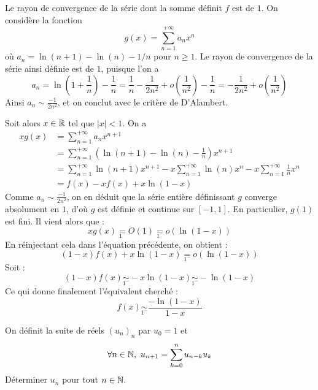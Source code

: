 \begin{solution}
Le rayon de convergence de la série dont la somme définit $f$ est de $1.$
On considère la fonction 
\[
    g(x)=\displaystyle\sum_{n=1}^{+\infty}a_nx^n
\] où $a_n=\ln(n+1)-\ln(n)-1/n$ pour $n\geq 1$.
Le rayon de convergence de la série ainsi définie est de $1$, puisque l'on a \[a_n=\ln\left(1+\frac1n\right)-\frac1n=\frac1n-\frac1{2n^2}+o\left(\frac1{n^2}\right)-\frac1n=-\frac1{2n^2}+o\left(\frac1{n^2}\right)\] 
Ainsi $a_n\sim\frac{-1}{2n^2}$, et on conclut avec le critère de D'Alambert.

Soit alors $x\in\operatorname{\mathbb R}$ tel que $|x|<1$. On a 
\begin{align*}
	xg(x)&=\displaystyle\sum_{n=1}^{+\infty}a_nx^{n+1}\\
		&=\displaystyle\sum_{n=1}^{+\infty}\left(\ln(n+1)-\ln(n)-\frac1n\right)x^{n+1}\\
		&=\displaystyle\sum_{n=1}^{+\infty}\ln(n+1)x^{n+1}-x\displaystyle\sum_{n=1}^{+\infty}\ln(n)x^n-x\displaystyle\sum_{n=1}^{+\infty}\frac1nx^n\\
		&=f(x)-xf(x)+x\ln(1-x)
\end{align*}
Comme $a_n\sim\frac{-1}{2n^2}$, on en déduit que la série entière définissant $g$ converge absolument en $1$, d'où $g$ est définie et continue sur $[-1,1]$. En particulier, $g(1)$ est fini.
Il vient alors que :
\[xg(x)\underset{1^{-}}{=}O(1)\underset{1^{-}}{=}o(\ln(1-x))\]
En réinjectant cela dans l'équation précédente, on obtient :
\[(1-x)f(x) + x\ln(1-x) \underset{1^{-}}{=} o(\ln(1-x))\]
Soit :
\[(1-x)f(x) \underset{1^{-}}{\sim} -x\ln(1-x) \underset{1^{-}}{\sim} -\ln(1-x)\]
Ce qui donne finalement l'équivalent cherché :
\[\boxed{f(x) \underset{1^-}{\sim} \frac{-\ln(1-x)}{1-x}}\]
\end{solution}

\begin{exo}
	\label{seriesent3}
	On définit la suite de réels $(u_n)_n$ par $u_0=1$ et \[\forall n\in\N,\ u_{n+1}=\sum_{k=0}^nu_{n-k}u_k\]
	Déterminer $u_n$ pour tout $n\in\operatorname{\mathbb N}$.
\end{exo}

